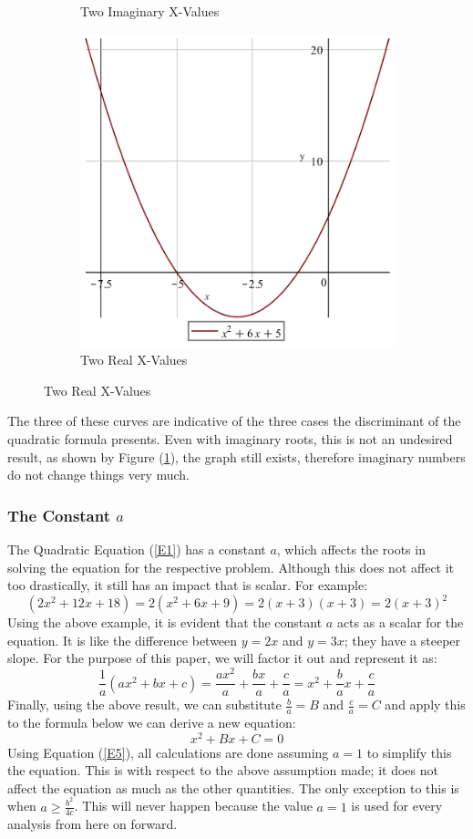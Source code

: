 \documentclass[14pt]{extarticle}
\begin{document}
\begin{figure}[h]
\begin{subfigure}{0.33\textwidth}
\caption{Two Imaginary X-Values}
\label{fig:img2}
\end{subfigure}
\begin{subfigure}{0.33\textwidth}
\includegraphics[width=0.8\linewidth]{graph3.png}
\caption{Two Real X-Values}
\label{fig:img3}
\end{subfigure}
\end{figure}
\normalsize

The three of these curves are indicative of the three cases the discriminant of the quadratic formula presents. Even with imaginary roots, this is not an undesired result, as shown by Figure (\ref{fig:img2}), the graph still exists, therefore imaginary numbers do not change things very much.
\subsubsection{The Constant $a$}
\indent The Quadratic Equation (\ref{E1}) has a constant $a$, which affects the roots in solving the equation for the respective problem. Although this does not affect it too drastically, it still has an impact that is scalar. For example: $$ (2x^2+12x+18) = 2(x^2+6x+9) = 2(x+3)(x+3) = 2(x+3)^2$$
\indent Using the above example, it is evident that the constant $a$ acts as a scalar for the equation. It is like the difference between $y=2x$ and $y=3x$; they have a steeper slope. For the purpose of this paper, we will factor it out and represent it as:
$$\frac{1}{a}(ax^2+bx+c) = \frac{ax^2}{a}+\frac{bx}{a}+\frac{c}{a} = x^2+\frac{b}{a}x+\frac{c}{a} $$
\indent Finally, using the above result, we can substitute $\frac{b}{a} = B $ and $\frac{c}{a} = C$ and apply this to the formula below we can derive a new equation:
\begin{equation}
x^2+Bx+C=0
\label{E5}
\end{equation}
\indent Using Equation (\ref{E5}), all calculations are done assuming $a=1$ to simplify this the equation. This is with respect to the above assumption made; it does not affect the equation as much as the other quantities. The only exception to this is when $a\geq\frac{b^2}{4c}$. This will never happen because the value $a=1$ is used for every analysis from here on forward.
\end{document}
